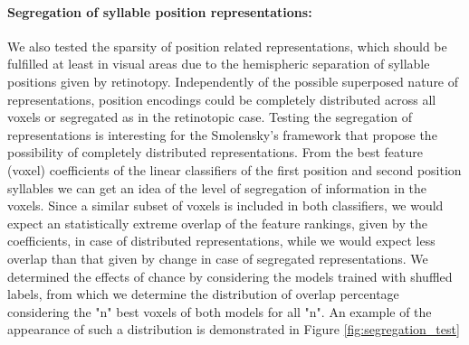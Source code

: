 \paragraph{Segregation of syllable position representations:}
We also tested the sparsity of position related representations, which should be fulfilled at least in visual areas due to the hemispheric separation of syllable positions given by retinotopy.
Independently of the possible superposed nature of representations, position encodings could be completely distributed across all voxels or segregated as in the retinotopic case.
Testing the segregation of representations is interesting for the Smolensky's framework that propose the possibility of completely distributed representations.
From the best feature (voxel) coefficients of the linear classifiers of the first position and second position syllables we can get an idea of the level of segregation of information in the voxels.
Since a similar subset of voxels is included in both classifiers, we would expect an statistically extreme overlap of the feature rankings, given by the coefficients, in case of distributed representations, while we would expect less overlap than that given by change in case of segregated representations.
We determined the effects of chance by considering the models trained with shuffled labels, from which we determine the distribution of overlap percentage considering the "n" best voxels of both models for all "n".
An example of the appearance of such a distribution is demonstrated in Figure \ref{fig:segregation_test}

